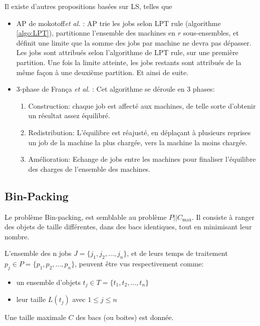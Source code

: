 \documentclass[a4paper,12pt]{report}
\theoremstyle{plain}				%
\theoremstyle{definition}				%
\newcommand\problemGrahamP{$P||C_{\max}$\xspace}
\newcommand{\lp}[1]{\todo[author=LP,color=yellow,inline]{#1}}
\newcommand{\fco}[1]{\todo[author=FCO,color=blue,inline]{#1}}
\begin{document}
Il existe d'autres propositions basées sur LS, telles que
\begin{itemize}
\item AP de mokotoff\emph{et al.} \cite{mokotoff2004exact}:
AP trie les jobs selon LPT rule (algorithme \ref{algo:LPT}),
partitionne l'ensemble des machines en $r$ sous-ensembles, et définit
une limite que la somme des jobs par machine ne devra pas dépasser.
Les jobs sont attribués selon l'algorithme de LPT rule, sur une
première partition.
Une fois la limite atteinte, les jobs restants sont attribués de la
même façon à une deuxième partition.
Et ainsi de suite.

\item 3-phase de França \emph{et al.} \cite{francca1994composite}:
  Cet algorithme se déroule en 3 phases:
  \begin{enumerate}
  \item Construction: chaque job est affecté aux machines, de telle
    sorte d'obtenir un résultat assez équilibré.
  \item Redistribution: L'équilibre est réajusté, en déplaçant à
    plusieurs reprises un job de la machine la plus chargée, vers la
    machine la moins chargée.
  \item Amélioration: Echange de jobs entre les machines pour
    finaliser l'équilibre des charges de l'ensemble des machines.
  \end{enumerate}
\end{itemize}

\lp{Dire en 2 mots ce qu'ils font?}
\fco{ok, fait}


\subsection{Bin-Packing} \label{ssec:heuristiquesBinPacking}

Le problème Bin-packing, est semblable au problème \problemGrahamP.
Il consiste à ranger des objets de taille différentes, dans des bacs
identiques, tout en minimisant leur nombre.

L'ensemble des n jobs $J = \{j_1, j_2, \ldots, j_n\}$, et de leurs temps de
traitement $p_j \in P = \{p_1, p_2, ..., p_n\}$, peuvent être vus
respectivement comme:
\begin{itemize}
\item un ensemble d'objets $t_j \in T = \{t_1, t_2, ..., t_n\}$
\item leur taille $L(t_j)$ avec $1 \le j \le n$
\end{itemize}
Une taille maximale $C$ des bacs (ou boites) est donnée.
\bigskip
\end{document}
